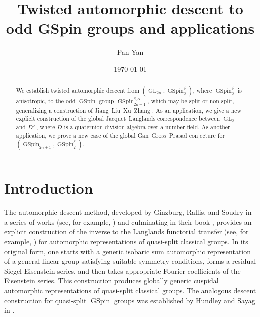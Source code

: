 \documentclass[12pt]{amsart}
\theoremstyle{remark}
\DeclareMathOperator{\GL}{GL}
\DeclareMathOperator{\GSpin}{GSpin}
\begin{document}
\title[Twisted automorphic descent to odd GSpin groups and applications]{Twisted automorphic descent to odd GSpin groups and applications}




\author{Pan Yan}
\address{Department of Mathematics, The University of Arizona, Tucson, AZ 85721, USA}



\date{\today}



\begin{abstract}
We establish twisted automorphic descent from $(\GL_{2n}, \GSpin_2^{\delta})$, where $\GSpin_2^{\delta}$ is anisotropic, to the odd $\GSpin$ group $\GSpin^{\delta,\alpha}_{2n+1}$, which may be split or non-split, generalizing a construction of Jiang--Liu--Xu--Zhang \cite{JiangLiuXuZhang2016}. 
As an application, we give a new explicit construction of the global Jacquet--Langlands correspondence between $\GL_2$ and $D^\times$, where $D$ is a quaternion division algebra over a number field. As another application, we prove a new case of the global Gan--Gross--Prasad conjecture for $(\GSpin_{2n+1}, \GSpin^{\delta}_2)$. 
\end{abstract}

\maketitle

\goodbreak 

\tableofcontents

\goodbreak


\section{Introduction}
 

The automorphic descent method, developed by Ginzburg, Rallis, and Soudry in a series of works
(see, for example, \cite{GinzburgRallisSoudry1997IMRN, GinzburgRallisSoudry1999Annals, GinzburgRallisSoudry1999JAMS, GinzburgRallisSoudry1999Duke, GinzburgRallisSoudry2001IMRN}) and culminating in their book \cite{GinzburgRallisSoudry2011}, 
provides an explicit construction of the inverse to the Langlands functorial transfer
(see, for example, \cite{CogdellKimPSShahidi2001, CogdellKimPSShahidi2004, CogdellPSShahidi2011, CaiFriedbergKaplan2024})
for automorphic representations of quasi-split classical groups. 
In its original form, one starts with a generic isobaric sum automorphic representation of a general linear group satisfying suitable symmetry conditions, forms a residual Siegel Eisenstein series, and then takes appropriate Fourier coefficients of the Eisenstein series. 
This construction produces globally generic cuspidal automorphic representations of quasi-split classical groups. 
The analogous descent construction for quasi-split $\GSpin$ groups was established by Hundley and Sayag in \cite{HundleySayag2016}. 
\end{document}
